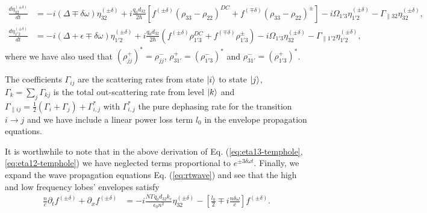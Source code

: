\documentclass[]{spie}  %
\begin{document}
\begin{align}
\frac{d \eta_{32}^{(\pm\delta)}}{d t} &= -i(\Delta \mp \delta\omega)\eta_{32}^{(\pm\delta)}
	+i\frac{q_0d_{32}}{2\hbar} \left[ f^{(\pm\delta)}(\rho_{33}-\rho_{22})^{DC} + f^{(\mp \delta)} (\rho_{33}-\rho_{22})^{\pm}\right]-i\Omega_{1'3}\eta_{1'2}^{(\pm\delta)}- \Gamma_{\parallel 32}\eta_{32}^{(\pm\delta)}, \label{eq:eta13-temphole} \\
\frac{d \eta_{1'2}^{(\pm\delta)}}{d t} &= -i(\Delta+\epsilon \mp \delta\omega)\eta_{1'2}^{(\pm\delta)}+i\frac{q_0d_{32}}{2\hbar} ( f^{(\pm\delta)}\rho_{1'3}^{DC} + f^{(\mp \delta)} \rho_{1'3}^{\pm})-i\Omega_{1'3}\eta_{32}^{(\pm\delta)}-
	\Gamma_{\parallel 1'2}\eta_{1'2}^{(\pm\delta)}, \label{eq:eta12-temphole}
\end{align} 
where we have also used that $(\rho_{jj}^{+})^* = \rho_{jj}^{-}$, $\rho_{31'}^{+} = (\rho_{1'3}^{-})^*$ and $\rho_{31'}^{-} = (\rho_{1'3}^{+})^*$. 

The coefficients $\Gamma_{ij} $ are the scattering rates from state $\ket{i}$ to state $\ket{j}$, $\Gamma_k = \sum_{j}\Gamma_{kj}$ is the total out-scattering rate from level $\ket{k}$ and $\Gamma_{\parallel ij} = \frac{1}{2}(\Gamma_{i} + \Gamma_j) + \Gamma_{i,j}^*$ with $\Gamma_{i,j}^*$ the pure dephasing rate for the transition $i\rightarrow j$ and we have include a linear power loss term $l_0$ in the envelope propagation equations. 
 
 It is worthwhile to note that in the above derivation of Eq. (\ref{eq:eta13-temphole},\ref{eq:eta12-temphole}) we have neglected terms proportional to $e^{\pm 3\delta \omega t}$. Finally, we expand the wave propagation equations Eq. (\ref{eq:rtwave}) and see that the high and low frequency lobes' envelopes satisfy
 \begin{align}
 \frac{n}{c}\partial_t f^{(\pm \delta)} + \partial_{x}f^{(\pm \delta)}&= -i\frac{N \Gamma q_0d_{32} k_c}{\epsilon_0 n^2} \eta_{32}^{(\pm \delta)} - \left[\frac{l_0}{2}  \mp i \frac{n\delta\omega}{c}\right] f^{(\pm \delta)}\label{eq:rtwave-temphole}.
 \end{align}
 
\end{document}
